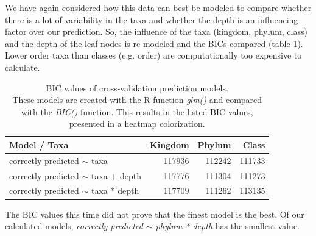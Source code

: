         We have again considered how this data can best be modeled to compare whether there is a lot 
        of variability in the taxa and whether the depth is an influencing factor over our prediction. 
        So, the influence of the taxa (kingdom, phylum, class) and the depth of the leaf nodes is 
        re-modeled and the BICs compared (table \ref{table:BIC cross-validation}). Lower order taxa than 
        classes (e.g. order) are computationally too expensive to calculate.


      \begin{table}[h]
        \begin{center}
          \begin{tabular}{ |l|r|r|r| }
            \hline
            \bfseries Model / Taxa & \bfseries Kingdom & \bfseries Phylum & \bfseries Class \\%
            \hline \hline
            correctly predicted $\sim$ taxa & 117936 & {\cellcolor{green!40}}112242 & {\cellcolor{green!50}}111733 \\%
            \hline
            correctly predicted $\sim$ taxa + depth & 117776 & {\cellcolor{green!50}}111304 & {\cellcolor{green!50}}111273 \\%
            \hline
            correctly predicted $\sim$ taxa * depth & 117709 & {\cellcolor{green!50}}111262 & {\cellcolor{green!30}}113135 \\%
            \hline
          \end{tabular} 
        \end{center}
        \caption{BIC values of cross-validation prediction models. \\
          These models are created with the R function \textit{glm()} and compared with the 
            \textit{BIC()} function. This results in the listed BIC values, presented in a heatmap colorization.}
        \label{table:BIC cross-validation} 
      \end{table}

      The BIC values this time did not prove that the finest model is the best. Of our calculated models, 
       \textit{correctly predicted $\sim$ phylum * depth} has the smallest value.

